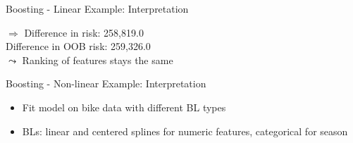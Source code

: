 \documentclass[11pt,compress,t,notes=noshow, aspectratio=169, xcolor=table]{beamer}
\begin{document}
\begin{frame}{Boosting - Linear Example: Interpretation}
\begin{center}
\scriptsize
$\Rightarrow$ Difference in risk: 258,819.0\\
Difference in OOB risk: 259,326.0\\
\normalsize
\medskip
$\leadsto$ Ranking of features stays the same

\end{center}

\end{frame}


\begin{frame}{Boosting - Non-linear Example: Interpretation}

\begin{itemize}
    \item Fit model on bike data with different BL types 
    \item BLs: linear and centered splines for numeric features, categorical for season
\end{itemize}
\begin{columns}[T, totalwidth = \linewidth]
\end{columns}
\end{frame}
\end{document}
